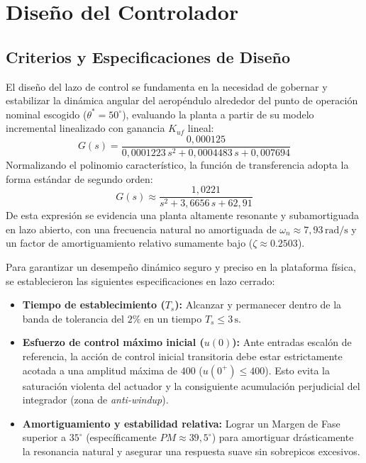 \section{Diseño del Controlador}

\subsection{Criterios y Especificaciones de Diseño}
El diseño del lazo de control se fundamenta en la necesidad de gobernar y estabilizar la dinámica angular del aeropéndulo alrededor del punto de operación nominal escogido ($\theta^* = 50^\circ$), evaluando la planta a partir de su modelo incremental linealizado con ganancia $K_{uf}$ lineal:
\begin{equation}
G(s) = \frac{0{,}000125}{0{,}0001223\,s^2 + 0{,}0004483\,s + 0{,}007694}
\end{equation}
Normalizando el polinomio característico, la función de transferencia adopta la forma estándar de segundo orden:
\begin{equation}
G(s) \approx \frac{1{,}0221}{s^2 + 3{,}6656\,s + 62{,}91}
\end{equation}
De esta expresión se evidencia una planta altamente resonante y subamortiguada en lazo abierto, con una frecuencia natural no amortiguada de $\omega_n \approx 7{,}93\,\mathrm{rad/s}$ y un factor de amortiguamiento relativo sumamente bajo ($\zeta \approx 0.2503$). 

Para garantizar un desempeño dinámico seguro y preciso en la plataforma física, se establecieron las siguientes especificaciones en lazo cerrado:
\begin{itemize}
  \item \textbf{Tiempo de establecimiento ($T_s$):} Alcanzar y permanecer dentro de la banda de tolerancia del $2\%$ en un tiempo $T_s \le 3\,\mathrm{s}$.
  \item \textbf{Esfuerzo de control máximo inicial ($u(0)$):} Ante entradas escalón de referencia, la acción de control inicial transitoria debe estar estrictamente acotada a una amplitud máxima de $400$ ($u(0^+) \le 400$). Esto evita la saturación violenta del actuador y la consiguiente acumulación perjudicial del integrador (zona de \textit{anti-windup}).
  \item \textbf{Amortiguamiento y estabilidad relativa:} Lograr un Margen de Fase superior a $35^\circ$ (específicamente $PM \approx 39{,}5^\circ$) para amortiguar drásticamente la resonancia natural y asegurar una respuesta suave sin sobrepicos excesivos.
\end{itemize}

